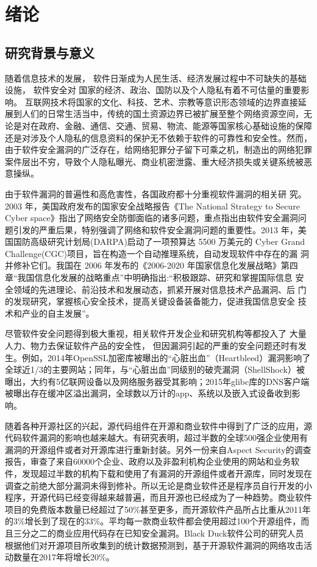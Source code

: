 \chapter{绪论}
\section{研究背景与意义}
随着信息技术的发展， %
软件日渐成为人民生活、经济发展过程中不可缺失的基础设施， %
软件安全对
国家的经济、政治、国防以及个人隐私有着不可估量的重要影响。
互联网技术将国家的文化、科技、艺术、宗教等意识形态领域的边界直接延展到人们的日常生活当中，传统的国土资源边界已被扩展至整个网络资源空间，无论是对在政府、金融、通信、交通、贸易、物流、能源等国家核心基础设施的保障还是对涉及个人隐私的信息资料的保护无不依赖于软件的可靠性和安全性。然而，由于软件安全漏洞的广泛存在，给网络犯罪分子留下可乘之机，制造出的网络犯罪案件层出不穷，导致个人隐私曝光、商业机密泄露、重大经济损失或关键系统被恶意操纵。

由于软件漏洞的普遍性和高危害性，各国政府都十分重视软件漏洞的相关研
究。2003 年，美国政府发布的国家安全战略报告《The National Strategy to Secure
Cyber space》指出了网络安全防御面临的诸多问题，重点指出由软件安全漏洞问
题引发的严重后果，特别强调了网络和软件安全漏洞问题的重要性。2013 年，美
国国防高级研究计划局(DARPA)启动了一项预算达 5500 万美元的 Cyber Grand
Challenge(CGC)项目，旨在构造一个自动推理系统，自动发现软件中存在的漏
洞并修补它们。我国在 2006 年发布的《2006-2020 年国家信息化发展战略》第四
章“我国信息化发展的战略重点”中明确指出:“积极跟踪、研究和掌握国际信息
安全领域的先进理论、前沿技术和发展动态，抓紧开展对信息技术产品漏洞、后
门的发现研究，掌握核心安全技术，提高关键设备装备能力，促进我国信息安全
技术和产业的自主发展”。

尽管软件安全问题得到极大重视，相关软件开发企业和研究机构等都投入了
大量人力、物力去保证软件产品的安全性，
但因漏洞引起的严重的安全问题还时有发生。例如，2014年OpenSSL加密库被曝出的“心脏出血”（Heartbleed）漏洞影响了全球近1/3的主要网站；同年，与“心脏出血”同级别的破壳漏洞（ShellShock）被曝出，大约有5亿联网设备以及网络服务器受其影响；2015年glibc库的DNS客户端被曝出存在缓冲区溢出漏洞，全球数以万计的app、系统以及嵌入式设备收到影响。

随着各种开源社区的兴起，源代码组件在开源和商业软件中得到了广泛的应用，源代码软件漏洞的影响也越来越大。有研究表明，超过半数的全球500强企业使用有漏洞的开源组件或者对开源库进行重新封装。另外一份来自Aspect Security的调查报告，审查了来自60000个企业、政府以及非盈利机构企业使用的网站和业务软件，发现超过半数的机构下载和使用了有漏洞的开源组件或者开源库，同时发现在调查之前绝大部分漏洞未得到修补。所以无论是商业软件还是程序员自行开发的小程序，开源代码已经变得越来越普遍，而且开源也已经成为了一种趋势。商业软件项目的免费版本数量已经超过了50\%甚至更多，而开源软件产品所占比重从2011年的3\%增长到了现在的33\%。平均每一款商业软件都会使用超过100个开源组件，而且三分之二的商业应用代码存在已知安全漏洞。Black Duck软件公司的研究人员根据他们对开源项目所收集到的统计数据预测到，基于开源软件漏洞的网络攻击活动数量在2017年将增长20\%。

